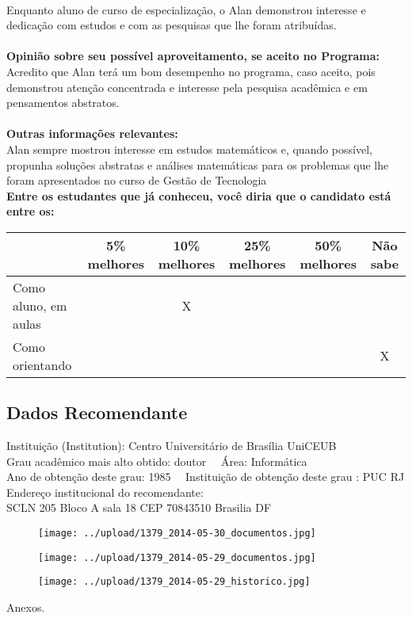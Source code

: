 \documentclass[11pt]{article}
\begin{document}
\\Enquanto aluno de curso de especialização, o Alan demonstrou interesse e dedicação com estudos e com as pesquisas que lhe foram atribuídas.\\
\\
\textbf{Opinião sobre seu possível aproveitamento, se aceito no Programa:}
\\Acredito que Alan terá um bom desempenho no programa, caso aceito, pois demonstrou atenção concentrada e interesse pela pesquisa acadêmica e em pensamentos abstratos.\\ 
\\
\textbf{Outras informações relevantes:} \\Alan sempre mostrou interesse em estudos matemáticos e, quando possível, propunha soluções abstratas e análises matemáticas para os problemas que lhe foram apresentados no curso de Gestão de Tecnologia
\\[0.3cm]
\textbf{Entre os estudantes que já conheceu, você diria que o candidato está entre os:}
\\
\begin{tabular}{|l|c|c|c|c|c|}
\hline
 & 5\% melhores & 10\% melhores & 25\% melhores & 50\% melhores & Não sabe \\
\hline
Como aluno, em aulas &  & X &  &  & \\
\hline
Como orientando &  &  &  &  & X\\
\hline
\end{tabular}
\subsection*{Dados Recomendante} 
	Instituição (Institution): Centro Universitário de Brasília   UniCEUB
\\ 
	Grau acadêmico mais alto obtido: doutor
	\ \ Área: Informática
	\\
	Ano de obtenção deste grau: 1985
	\ \ 
	Instituição de obtenção deste grau : PUC RJ
	\\ 
	Endereço institucional do recomendante: \\ SCLN 205 Bloco A sala 18  CEP 70843510  Brasilia DF	
\begin{figure}[!htb]
\texttt{[image: ../upload/1379\_2014-05-30\_documentos.jpg]}
\end{figure}	
\begin{figure}[!htb]
\texttt{[image: ../upload/1379\_2014-05-29\_documentos.jpg]}
\end{figure}	
\begin{figure}[!htb]
\texttt{[image: ../upload/1379\_2014-05-29\_historico.jpg]}
\end{figure} 
\begin{center}
Anexos.
\end{center}
\end{document}
